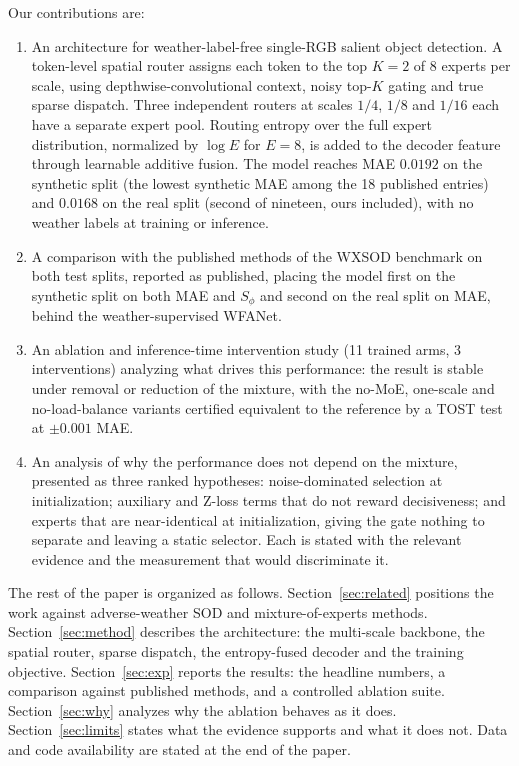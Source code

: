 \documentclass[10pt,a4paper,twocolumn,twoside]{article}
\begin{document}
Our contributions are:
\begin{enumerate}[leftmargin=*,nosep,label=\arabic*)]
  \item An architecture for weather-label-free single-RGB salient object detection. A
        token-level spatial router assigns each token to the top $K{=}2$ of 8 experts per
        scale, using depthwise-convolutional context, noisy top-$K$ gating and
        true sparse dispatch. Three independent routers at scales $1/4$, $1/8$ and $1/16$
        each have a separate expert pool. Routing entropy over the full expert
        distribution, normalized by $\log E$ for $E{=}8$, is added to the decoder feature
        through learnable additive fusion. The model reaches MAE $0.0192$ on the synthetic
        split (the lowest synthetic MAE among the 18 published entries) and $0.0168$ on the real split (second of nineteen,
        ours included), with no weather labels at training or
        inference.
  \item A comparison with the published methods of the WXSOD benchmark on both test
        splits, reported as published, placing the model first on the synthetic split on
        both MAE and $S_\phi$ and second on the real split on MAE, behind the
        weather-supervised WFANet.
  \item An ablation and inference-time intervention study (11 trained arms, 3
        interventions) analyzing what drives this performance: the result is stable under
        removal or reduction of the mixture, with the no-MoE, one-scale and
        no-load-balance variants certified equivalent to the reference by a TOST test at
        $\pm0.001$ MAE.
  \item An analysis of why the performance does not depend on the mixture, presented as
        three ranked hypotheses: noise-dominated selection at initialization; auxiliary and Z-loss
        terms that do not reward decisiveness; and experts that are near-identical at
        initialization, giving the gate nothing to separate and leaving a static selector. Each
        is stated with the relevant evidence and the measurement that would discriminate
        it.
\end{enumerate}

The rest of the paper is organized as follows.
Section~\ref{sec:related} positions the work against adverse-weather SOD and mixture-of-experts methods.
Section~\ref{sec:method} describes the architecture: the multi-scale backbone, the spatial router, sparse
dispatch, the entropy-fused decoder and the training objective.
Section~\ref{sec:exp} reports the results: the headline numbers, a comparison against published
methods, and a controlled ablation suite.
Section~\ref{sec:why} analyzes why the ablation behaves as it does.
Section~\ref{sec:limits} states what the evidence supports and what it does not.
Data and code availability are stated at the end of the paper.
\end{document}

